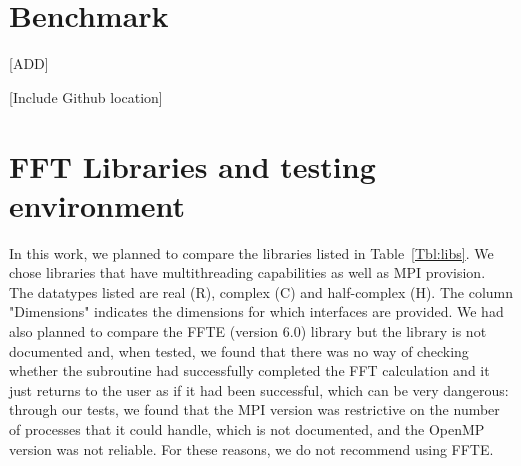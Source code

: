 \documentclass[a4paper]{article}
\begin{document}
\section{Benchmark}\label{Sec:Benchmark}


[ADD]

[Include Github location]


\section{FFT Libraries and testing environment}\label{Sec:libs}

In this work, we planned to compare the libraries listed in
Table~\ref{Tbl:libs}. We chose libraries that have multithreading
capabilities as well as MPI provision.  The datatypes listed are real
(R), complex (C) and half-complex (H). The column "Dimensions"
indicates the dimensions for which interfaces are provided.  We had
also planned to compare the FFTE (version 6.0) library but the library
is not documented and, when tested, we found that there was no way of
checking whether the subroutine had successfully completed the FFT
calculation and it just returns to the user as if it had been
successful, which can be very dangerous: through our tests, we found
that the MPI version was restrictive on the number of processes that
it could handle, which is not documented, and the OpenMP version was
not reliable. For these reasons, we do not recommend using FFTE.
\end{document}
